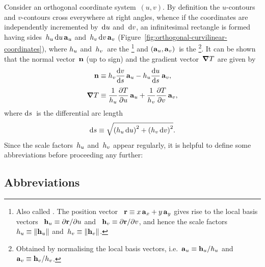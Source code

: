 Consider an orthogonal coordinate system~$(u, v)$.
By definition the $u$-contours and $v$-contours
cross everywhere at right angles,
whence if the coordinates are independently incremented
by~$\mathop{}\!\mathrm{d} u$ and~$\mathop{}\!\mathrm{d} v$,
an infinitesimal rectangle is formed
having sides~$\scalefac[u] \td u \basisvec{u}$
and~$\scalefac[v] \td v \basisvec{v}$
(Figure~\ref{fig:orthogonal-curvilinear-coordinates}),
where $\scalefac[u]$ and~$\scalefac[v]$~are the %
\footnote{
  Also called .
  The position vector~%
    $\boldsymbol{\mathbf{r}} \equiv x \mathop{}\!\boldsymbol{\mathbf{a}}_{x} + y \mathop{}\!\boldsymbol{\mathbf{a}}_{y}$
  gives rise to the local basis vectors~%
    $\mathop{}\!\boldsymbol{\mathbf{h}}_{u} \equiv \mathop{}\!\partial\boldsymbol{\mathbf{r}} / {\mathop{}\!\partial u}$
  and~%
    $\mathop{}\!\boldsymbol{\mathbf{h}}_{v} \equiv \mathop{}\!\partial\boldsymbol{\mathbf{r}} / {\mathop{}\!\partial v}$,
  and hence the scale factors~$\scalefac[u] \ideq \norm{\localvec{u}}$
  and~$\scalefac[v] \ideq \norm{\localvec{v}}$.
}
and $(\mathop{}\!\boldsymbol{\mathbf{a}}_{u}, \mathop{}\!\boldsymbol{\mathbf{a}}_{v})$~is the %
\footnote{
  Obtained by normalising the local basis vectors,
  i.e.~$\basisvec{u} \ideq \localvec{u} / \scalefac[u]$
  and~$\basisvec{v} \ideq \localvec{v} / \scalefac[v]$.
}.
It can be shown that the normal vector~$\mathop{}\!\boldsymbol{\mathbf{n}}$ (up to sign)
and the gradient vector~$\mathop{}\!\boldsymbol{\mathbf{\nabla}} T$ are given by
\begin{align}
  \normalvec &\ideq
    \scalefac[v] \tder{v}{s} \basisvec{u}
      -
    \scalefac[u] \tder{u}{s} \basisvec{v},
    \label{eq:normal-vector}
    \\[\tallspace]
  \del T &\ideq
    \frac{1}{\scalefac[u]} \pder{T}{u} \basisvec{u}
      +
    \frac{1}{\scalefac[v]} \pder{T}{v} \basisvec{v},
    \label{eq:gradient}
\end{align}
where $\mathop{}\!\mathrm{d} s$~is the differential arc length
\begin{equation}
  \td s \ideq
  \sqrt{
    \roundbr[\bulkysize]{\scalefac[u] \td u}^2
      +
    \roundbr[\bulkysize]{\scalefac[v] \td v}^2
  }.
  \label{eq:differential-arc-length}
\end{equation}
Since the scale factors~$\scalefac[u]$ and~$\scalefac[v]$ appear regularly,
it is helpful to define some abbreviations
before proceeding any further:

\subsection{Abbreviations}
\label{sec:curvilinear.derivative.abbreviations}

